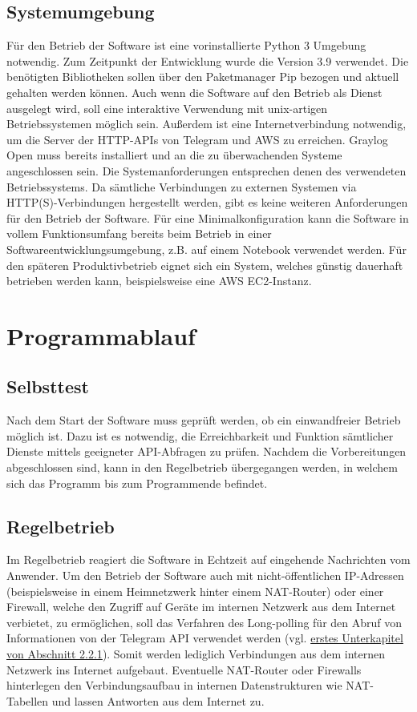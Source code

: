 \subsection{Systemumgebung}
Für den Betrieb der Software ist eine vorinstallierte Python 3 Umgebung notwendig. Zum Zeitpunkt der Entwicklung wurde die Version 3.9 verwendet. Die benötigten Bibliotheken sollen über den Paketmanager Pip bezogen und aktuell gehalten werden können. Auch wenn die Software auf den Betrieb als Dienst ausgelegt wird, soll eine interaktive Verwendung mit unix-artigen Betriebssystemen möglich sein. Außerdem ist eine Internetverbindung notwendig, um die Server der HTTP-APIs von Telegram und AWS zu erreichen. Graylog Open muss bereits installiert und an die zu überwachenden Systeme angeschlossen sein. Die Systemanforderungen entsprechen denen des verwendeten Betriebssystems. Da sämtliche Verbindungen zu externen Systemen via HTTP(S)-Verbindungen hergestellt werden, gibt es keine weiteren Anforderungen für den Betrieb der Software. Für eine Minimalkonfiguration kann die Software in vollem Funktionsumfang bereits beim Betrieb in einer Softwareentwicklungsumgebung, z.B. auf einem Notebook verwendet werden. Für den späteren Produktivbetrieb eignet sich ein System, welches günstig dauerhaft betrieben werden kann, beispielsweise eine AWS EC2-Instanz.

\section{Programmablauf}

\subsection{Selbsttest}
\label{sec:grundsaetzlicher-aufbau}

Nach dem Start der Software muss geprüft werden, ob ein einwandfreier Betrieb möglich ist. Dazu ist es notwendig, die Erreichbarkeit und Funktion sämtlicher Dienste mittels geeigneter API-Abfragen zu prüfen. Nachdem die Vorbereitungen abgeschlossen sind, kann in den Regelbetrieb übergegangen werden, in welchem sich das Programm bis zum Programmende befindet. 

\subsection{Regelbetrieb}

Im Regelbetrieb reagiert die Software in Echtzeit auf eingehende Nachrichten vom Anwender. 
Um den Betrieb der Software auch mit nicht-öffentlichen IP-Adressen (beispielsweise in einem Heimnetzwerk hinter einem NAT-Router) oder einer Firewall, welche den Zugriff auf Geräte im internen Netzwerk aus dem Internet verbietet, zu ermöglichen, soll das Verfahren des Long-polling für den Abruf von Informationen von der Telegram API verwendet werden (vgl. \hyperref[sec:telegram-getting-updates]{erstes Unterkapitel von Abschnitt 2.2.1}). Somit werden lediglich Verbindungen aus dem internen Netzwerk ins Internet aufgebaut. Eventuelle NAT-Router oder Firewalls hinterlegen den Verbindungsaufbau in internen Datenstrukturen wie NAT-Tabellen und lassen Antworten aus dem Internet zu.

